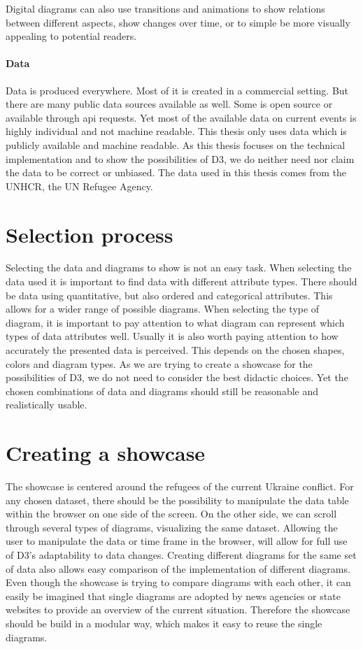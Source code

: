 \documentclass[
a4paper,     %
12pt         %
]{scrartcl}  %
\begin{document}
Digital diagrams can also use transitions and animations to show relations between different aspects, show changes over time, or to simple be more visually appealing to potential readers.

\paragraph{Data}
Data is produced everywhere. Most of it is created in a commercial setting. But there are many public data sources available as well. Some is open source or available through api requests. Yet most of the available data on current events is highly individual and not machine readable. This thesis only uses data which is publicly available and machine readable. As this thesis focuses on the technical implementation and to show the possibilities of D3, we do neither need nor claim the data to be correct or unbiased. The data used in this thesis comes from the UNHCR, the UN Refugee Agency.

\section{Selection process}
Selecting the data and diagrams to show is not an easy task. When selecting the data used it is important to find data with different attribute types. There should be data using quantitative, but also ordered and categorical attributes. This allows for a wider range of possible diagrams. When selecting the type of diagram, it is important to pay attention to what diagram can represent which types of data attributes well. Usually it is also worth paying attention to how accurately the presented data is perceived. This depends on the chosen shapes, colors and diagram types. As we are trying to create a showcase for the possibilities of D3, we do not need to consider the best didactic choices. Yet the chosen combinations of data and diagrams should still be reasonable and realistically usable.

\section{Creating a showcase}
The showcase is centered around the refugees of the current Ukraine conflict. For any chosen dataset, there should be the possibility to manipulate the data table within the browser on one side of the screen. On the other side, we can scroll through several types of diagrams, visualizing the same dataset. Allowing the user to manipulate the data or time frame in the browser, will allow for full use of D3's adaptability to data changes. Creating different diagrams for the same set of data also allows easy comparison of the implementation of different diagrams. Even though the showcase is trying to compare diagrams with each other, it can easily be imagined that single diagrams are adopted by news agencies or state websites to provide an overview of the current situation. Therefore the showcase should be build in a modular way, which makes it easy to reuse the single diagrams.
\end{document}
